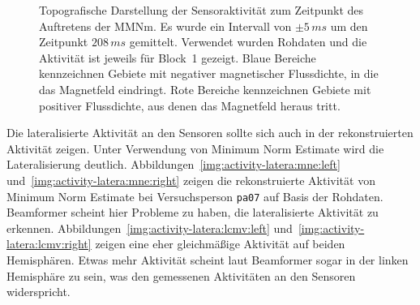 \documentclass[doc,a4paper,12pt]{apa6}
\begin{document}
\begin{figure}
\begin{subfigure}[c]{0.47\textwidth}
    \label{img:topolot:pa10a1}
  \end{subfigure}
  \captionsetup{justification=justified}
  \vspace*{3mm}
  \caption[Topografische Darstellung der Sensoraktivität zum Zeitpunkt des Auftretens der MMNm]{Topografische Darstellung der Sensoraktivität zum Zeitpunkt des Auftretens der MMNm. Es wurde ein Intervall von $\pm5\,ms$ um den Zeitpunkt $208\,ms$ gemittelt. Verwendet wurden Rohdaten und die Aktivität ist jeweils für Block~1 gezeigt. Blaue Bereiche kennzeichnen Gebiete mit negativer magnetischer Flussdichte, in die das Magnetfeld eindringt. Rote Bereiche kennzeichnen Gebiete mit positiver Flussdichte, aus denen das Magnetfeld heraus tritt.}
  \label{img:topolot}
\end{figure}

Die lateralisierte Aktivität an den Sensoren sollte sich auch in der rekonstruierten Aktivität zeigen. Unter Verwendung von Minimum Norm Estimate wird die Lateralisierung deutlich. Abbildungen~\ref{img:activity-latera:mne:left} und~\ref{img:activity-latera:mne:right} zeigen die rekonstruierte Aktivität von Minimum Norm Estimate bei Versuchsperson \texttt{pa07} auf Basis der Rohdaten. Beamformer scheint hier Probleme zu haben, die lateralisierte Aktivität zu erkennen. Abbildungen~\ref{img:activity-latera:lcmv:left} und~\ref{img:activity-latera:lcmv:right} zeigen eine eher gleichmäßige Aktivität auf beiden Hemisphären. Etwas mehr Aktivität scheint laut Beamformer sogar in der linken Hemisphäre zu sein, was den gemessenen Aktivitäten an den Sensoren widerspricht.
\end{document}
